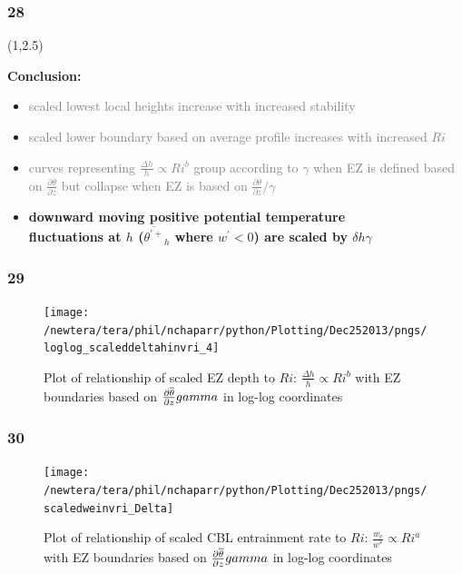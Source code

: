 \documentclass{beamer}
\newcommand\FrameText[1]{
\begin{textblock}{16}(1,2.5)
\raggedright #1
\end{textblock}}
\begin{document}
\begin{frame}
\frametitle{28}
\FrameText{\bf{\large Conclusion:}
\vspace{5mm}
\begin{itemize}
\item \textcolor{gray}{scaled lowest local heights increase with increased stability}
\vspace{5mm}
\item \textcolor{gray}{scaled lower boundary based on average profile increases with increased $Ri$}
\vspace{5mm}
\item \textcolor{gray}{curves representing  $\frac{\Delta h}{h} \propto Ri ^{b}$ group according to $\gamma$ when EZ is defined based on $\frac{\partial \overline{\theta}}{\partial z}$ but collapse when EZ is based on $\frac{\partial \overline{\theta}}{\partial z}/\gamma$}
\vspace{5mm} 
\item \bf{\large downward moving positive potential temperature\\
fluctuations at $h$ ($\overline{\theta^{'+}}_{h}$ where $w^{'}<0$) are scaled by $\delta h \gamma$}
\end{itemize}
}
\end{frame}

\begin{frame}
\frametitle{29}
\fontsize{12pt}{7.2}\selectfont
\begin{figure}
\centering
\texttt{[image: /newtera/tera/phil/nchaparr/python/Plotting/Dec252013/pngs/loglog\_scaleddeltahinvri\_4]}
\caption{Plot of relationship of scaled EZ depth to $Ri$: $\frac{\Delta h}{h} \propto Ri ^{b}$ with EZ boundaries based on $\frac{\partial \overline{\theta}}{\partial z}\/gamma$ in log-log coordinates}
\end{figure}
\end{frame}

\begin{frame}
\frametitle{30}
\fontsize{12pt}{7.2}\selectfont
\begin{figure}
\texttt{[image: /newtera/tera/phil/nchaparr/python/Plotting/Dec252013/pngs/scaledweinvri\_Delta]}
\caption{Plot of relationship of scaled CBL entrainment rate to $Ri$: $\frac{w_{e}}{w^{*}} \propto  Ri^{a}$ with EZ boundaries based on $\frac{\partial \overline{\theta}}{\partial z}\/gamma$ in log-log coordinates}
\end{figure}
\end{frame}
\end{document}
